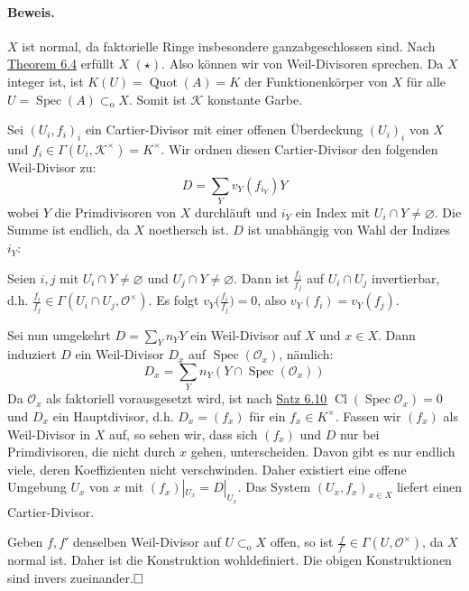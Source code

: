 \documentclass[11pt,b5paper,openany]{memoir}
\def \qed {$\hfill\square$}
\begin{document}
\paragraph{Beweis.} $X$ ist normal, da faktorielle Ringe insbesondere ganzabgeschlossen sind. Nach \hyperref[6.4]{Theorem 6.4} erfüllt $X$ $(\star)$. Also können wir von Weil-Divisoren sprechen. Da $X$ integer ist, ist $K(U)=\operatorname{Quot}(A)= K$ der Funktionenkörper von $X$ für alle $U=\operatorname{Spec}(A)\subset_\text{o}X$. Somit ist $\mathcal{K}$ konstante Garbe.

Sei $(U_i,f_i)_i$ ein Cartier-Divisor mit einer offenen Überdeckung $(U_i)_i$ von $X$ und $f_i\in\Gamma(U_i,\mathcal{K}^\times)=K^\times$. Wir ordnen diesen Cartier-Divisor den folgenden Weil-Divisor zu:
\[D=\sum_Y v_Y(f_{i_Y})Y \]
wobei $Y$ die Primdivisoren von $X$ durchläuft und $i_Y$ ein Index mit $U_i\cap Y\neq\varnothing$. Die Summe ist endlich, da $X$ noethersch ist. $D$ ist unabhängig von Wahl der Indizes $i_Y$:

Seien $i,j$ mit $U_i\cap Y\neq\varnothing$ und $U_j\cap Y\neq\varnothing$. Dann ist $\frac{f_i}{f_j}$ auf $U_i\cap U_j$ invertierbar, d.h. $\frac{f_i}{f_j}\in\Gamma(U_i\cap U_j,\mathcal{O}^\times)$. Es folgt $v_Y\big(\frac{f_i}{f_j}\big)=0$, also $v_Y(f_i)=v_Y(f_j)$.

Sei nun umgekehrt $D=\sum_Yn_YY$ ein Weil-Divisor auf $X$ und $x\in X$. Dann induziert $D$ ein Weil-Divisor $D_x$ auf $\operatorname{Spec}(\mathcal{O}_x)$, nämlich:
\[D_x=\sum_Y n_Y(Y\cap\operatorname{Spec}(\mathcal{O}_x)) \]
Da $\mathcal{O}_x$ als faktoriell vorausgesetzt wird, ist nach \hyperref[6.10]{Satz 6.10} $\operatorname{Cl}(\operatorname{Spec}\mathcal{O}_x)=0$ und $D_x$ ein Hauptdivisor, d.h. $D_x=(f_x)$ für ein $f_x\in K^\times$. Fassen wir $(f_x)$ als Weil-Divisor in $X$ auf, so sehen wir, dass sich $(f_x)$ und $D$ nur bei Primdivisoren, die nicht durch $x$ gehen, unterscheiden. Davon gibt es nur endlich viele, deren Koeffizienten nicht verschwinden. Daher existiert eine offene Umgebung $U_x$ von $x$ mit $(f_x)|_{U_x}=D|_{U_x}$. Das System $(U_x,f_x)_{x\in X}$ liefert einen Cartier-Divisor.

Geben $f,f'$ denselben Weil-Divisor auf $U\subset_\text{o}X$ offen, so ist $\frac{f}{f'}\in\Gamma(U,\mathcal{O}^\times)$, da $X$ normal ist. Daher ist die Konstruktion wohldefiniert. Die obigen Konstruktionen sind invers zueinander.\qed

\printindex
\end{document}
